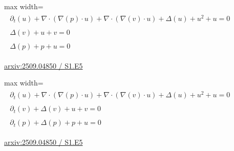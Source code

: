 \documentclass[UTF8,10pt,a4paper,fontset=mac]{ctexart}
\begin{document}
\begin{minipage}{\linewidth}\begin{center}\begin{adjustbox}{max width=\linewidth}$\displaystyle\begin{gathered}\begin{gathered}\partial_{t}(u)+\nabla\cdot(\nabla(p)\cdot u)+\nabla\cdot(\nabla(v)\cdot u)+\Delta(u)+u^{2}+u=0\end{gathered}\\[5pt]\begin{gathered}\Delta(v)+u+v=0\end{gathered}\\[5pt]\begin{gathered}\Delta(p)+p+u=0\end{gathered}\end{gathered}$\end{adjustbox}\end{center}{\small\href{https://arxiv.org/html/2509.04850#S1.E5}{arxiv:2509.04850 / S1.E5}}\par\end{minipage}\par\vspace{6mm}

\begin{minipage}{\linewidth}\begin{center}\begin{adjustbox}{max width=\linewidth}$\displaystyle\begin{gathered}\begin{gathered}\partial_{t}(u)+\nabla\cdot(\nabla(p)\cdot u)+\nabla\cdot(\nabla(v)\cdot u)+\Delta(u)+u^{2}+u=0\end{gathered}\\[5pt]\begin{gathered}\partial_{t}(v)+\Delta(v)+u+v=0\end{gathered}\\[5pt]\begin{gathered}\partial_{t}(p)+\Delta(p)+p+u=0\end{gathered}\end{gathered}$\end{adjustbox}\end{center}{\small\href{https://arxiv.org/html/2509.04850#S1.E5}{arxiv:2509.04850 / S1.E5}}\par\end{minipage}\par\vspace{6mm}
\end{document}
